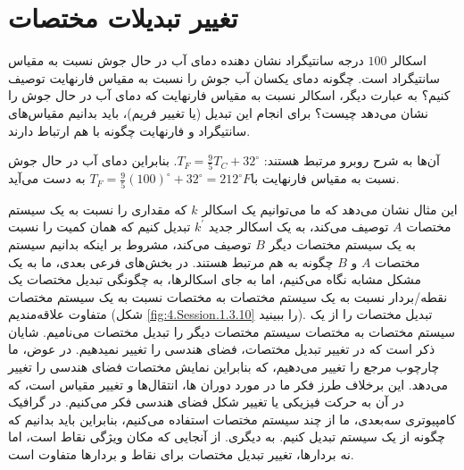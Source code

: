 \section{\textbf{تغییر تبدیلات مختصات}}
\label{sec:3.4}
{
    \Large
    \begin{spacing}{1.5}
        اسکالر $100$ درجه سانتیگراد نشان دهنده دمای آب در حال جوش نسبت به مقیاس سانتیگراد است.
        چگونه دمای یکسان آب جوش را نسبت به مقیاس فارنهایت توصیف کنیم؟ به عبارت دیگر، اسکالر نسبت به مقیاس فارنهایت که دمای آب در حال جوش را نشان می‌دهد چیست؟ برای انجام این تبدیل (یا تغییر فریم)، ​​باید بدانیم مقیاس‌های سانتیگراد و فارنهایت چگونه با هم ارتباط دارند.

        آن‌ها به شرح روبرو مرتبط هستند:
        $T_{F}=\frac{\displaystyle 9}{\displaystyle 5}T_{C}+32^\circ$. بنابراین دمای آب در حال جوش نسبت به مقیاس فارنهایت با$T_{F}=\frac{\displaystyle 9}{\displaystyle 5}(100)^\circ+32^\circ=212^\circ F$ به دست می‌آید.

        این مثال نشان می‌دهد که ما می‌توانیم یک اسکالر $k$ که مقداری را نسبت به یک سیستم مختصات $A$ توصیف می‌کند،
        به یک اسکالر جدید $k^\prime$ تبدیل کنیم که همان کمیت را نسبت به یک سیستم مختصات دیگر $B$ توصیف می‌کند،
        مشروط بر اینکه بدانیم سیستم مختصات $A$ و  $B$ چگونه به هم مرتبط هستند.
        در بخش‌های فرعی بعدی، ما به یک مشکل مشابه نگاه می‌کنیم، اما به جای اسکالرها، به چگونگی تبدیل مختصات یک نقطه/بردار نسبت به یک سیستم مختصات به مختصات نسبت به یک سیستم مختصات متفاوت علاقه‌مندیم (شکل \ref{fig:4.Session.1.3.10} را ببینید).
        تبدیل مختصات را از یک سیستم مختصات به مختصات سیستم مختصات دیگر را تبدیل مختصات می‌نامیم.
        شایان ذکر است که در تغییر تبدیل مختصات، فضای هندسی را تغییر نمیدهیم. در عوض، ما چارچوب مرجع را تغییر می‌دهیم، که بنابراین نمایش مختصات فضای هندسی را تغییر می‌دهد.
        این برخلاف طرز فکر ما در مورد دوران ها، انتقال‌ها و تغییر مقیاس است، که در آن به حرکت فیزیکی یا تغییر شکل فضای هندسی فکر می‌کنیم.
        در گرافیک کامپیوتری سه‌بعدی، ما از چند سیستم مختصات استفاده می‌کنیم، بنابراین باید بدانیم که چگونه از یک سیستم تبدیل کنیم.
        به دیگری. از آنجایی که مکان ویژگی نقاط است، اما نه بردارها، تغییر تبدیل مختصات برای نقاط و بردارها متفاوت است.


\end{spacing}}
